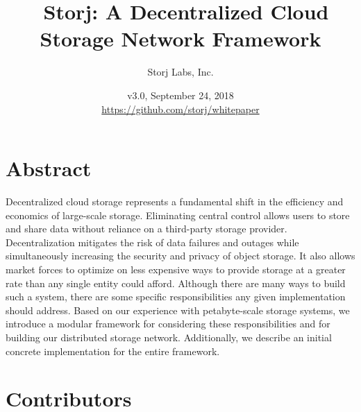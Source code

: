 \documentclass[8pt,fleqn,openany]{book}
\title{\textbf{\sffamily\color{white} \
Storj: A Decentralized Cloud Storage Network Framework}}
\author{\small\sffamily\color{white}
Storj Labs, Inc.}
\date{\small\sffamily\color{white} v3.0, September 24, 2018\\
\small\color{white}\url{https://github.com/storj/whitepaper}
}
\begin{document}
\thispagestyle{fancy}

\maketitle


\newpage

\tableofcontents\newpage

\section{Abstract}

Decentralized cloud storage represents a fundamental shift in
the efficiency and economics of large-scale storage.
Eliminating central control allows users to store and share data
without reliance on a third-party storage provider. Decentralization mitigates
the risk of data failures and outages while simultaneously increasing
the security and privacy of object storage. It also
allows market forces to optimize on less expensive ways to
provide storage at a greater rate than any single entity could afford.
Although there are many ways to build such a system, there are some specific
responsibilities any given implementation should address.
Based on our experience with petabyte-scale
storage systems, we introduce a modular framework for considering these
responsibilities and for building our distributed storage network.
Additionally, we describe an initial
concrete implementation for the entire framework.

\section{Contributors}
\end{document}
